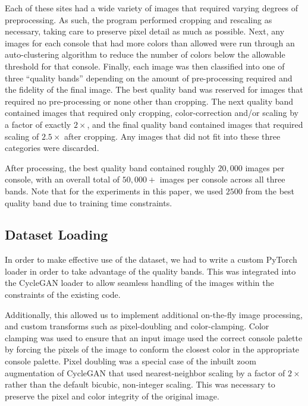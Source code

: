 \documentclass[10pt,twocolumn,letterpaper]{article}
\begin{document}
Each of these sites had a wide variety of images that required varying degrees of preprocessing. As such, the program performed cropping and rescaling as necessary, taking care to preserve pixel detail as much as possible.
Next, any images for each console that had more colors than allowed were run through an auto-clustering algorithm to reduce the number of colors below the allowable threshold for that console.
Finally, each image was then classified into one of three ``quality bands'' depending on the amount of pre-processing required and the fidelity of the final image. The best quality band was reserved for images that required no pre-processing or none other than cropping. The next quality band contained images that  required only cropping, color-correction and/or scaling by a factor of exactly $2\times$, and the final quality band contained images that required scaling of $2.5\times$ after cropping. Any images that did not fit into these three categories were discarded.

After processing, the best quality band contained roughly $20,000$ images per console, with an overall total of $50,000+$ images per console across all three bands. Note that for the experiments in this paper, we used $2500$ from the best quality band due to training time constraints.

\subsection{Dataset Loading}
In order to make effective use of the dataset, we had to write a custom PyTorch loader in order to take advantage of the quality bands. This was integrated into the CycleGAN loader to allow seamless handling of the images within the constraints of the existing code.

Additionally, this allowed us to implement additional on-the-fly image processing, and custom transforms such as pixel-doubling and color-clamping. Color clamping was used to ensure that an input image used the correct console palette by forcing the pixels of the image to conform the closest color in the appropriate console palette.
Pixel doubling was a special case of the inbuilt zoom augmentation of CycleGAN that used nearest-neighbor scaling by a factor of $2\times$ rather than the default bicubic, non-integer scaling. This was necessary to preserve the pixel and color integrity of the original image.
\end{document}
